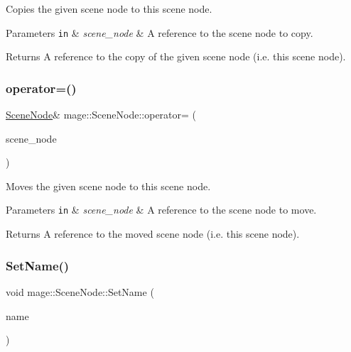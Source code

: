 Copies the given scene node to this scene node.


\begin{DoxyParams}[1]{Parameters}
\mbox{\tt in}  & {\em scene\+\_\+node} & A reference to the scene node to copy. \\
\hline
\end{DoxyParams}
\begin{DoxyReturn}{Returns}
A reference to the copy of the given scene node (i.\+e. this scene node). 
\end{DoxyReturn}
\hypertarget{classmage_1_1_scene_node_ae38092ba9ec8449f15b3c1f8285ba500}{}\label{classmage_1_1_scene_node_ae38092ba9ec8449f15b3c1f8285ba500} 
\subsubsection{\texorpdfstring{operator=()}{operator=()}\hspace{0.1cm}{\footnotesize\ttfamily [2/2]}}
{\footnotesize\ttfamily \hyperlink{classmage_1_1_scene_node}{Scene\+Node}\& mage\+::\+Scene\+Node\+::operator= (\begin{DoxyParamCaption}\item[{\hyperlink{classmage_1_1_scene_node}{Scene\+Node} \&\&}]{scene\+\_\+node }\end{DoxyParamCaption})\hspace{0.3cm}{\ttfamily [delete]}}

Moves the given scene node to this scene node.


\begin{DoxyParams}[1]{Parameters}
\mbox{\tt in}  & {\em scene\+\_\+node} & A reference to the scene node to move. \\
\hline
\end{DoxyParams}
\begin{DoxyReturn}{Returns}
A reference to the moved scene node (i.\+e. this scene node). 
\end{DoxyReturn}
\hypertarget{classmage_1_1_scene_node_a11a6d53a9ba637813b34347b68ad08d6}{}\label{classmage_1_1_scene_node_a11a6d53a9ba637813b34347b68ad08d6} 
\subsubsection{\texorpdfstring{Set\+Name()}{SetName()}\hspace{0.1cm}{\footnotesize\ttfamily [1/2]}}
{\footnotesize\ttfamily void mage\+::\+Scene\+Node\+::\+Set\+Name (\begin{DoxyParamCaption}\item[{const string \&}]{name }\end{DoxyParamCaption})}

